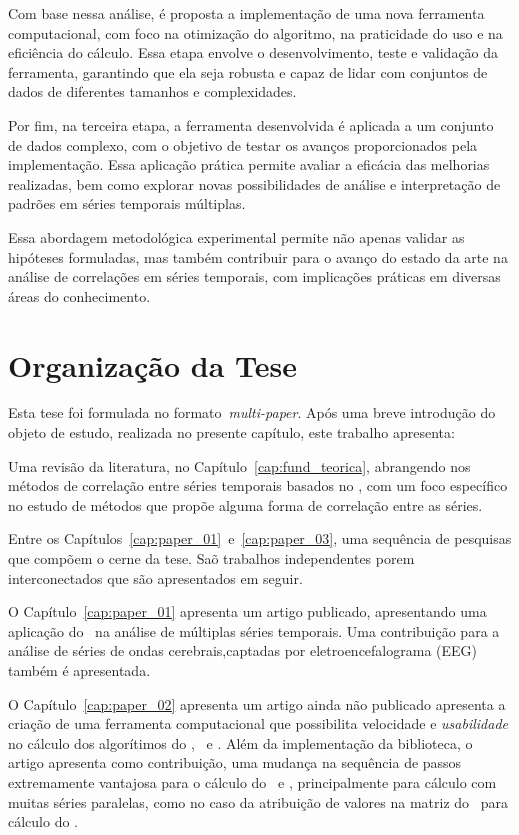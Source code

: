 Com base nessa análise, é proposta a implementação de uma nova ferramenta computacional, com foco na otimização do algoritmo, na praticidade do uso e na eficiência do cálculo. Essa etapa envolve o desenvolvimento, teste e validação da ferramenta, garantindo que ela seja robusta e capaz de lidar com conjuntos de dados de diferentes tamanhos e complexidades.

Por fim, na terceira etapa, a ferramenta desenvolvida é aplicada a um conjunto de dados complexo, com o objetivo de testar os avanços proporcionados pela implementação. Essa aplicação prática permite avaliar a eficácia das melhorias realizadas, bem como explorar novas possibilidades de análise e interpretação de padrões em séries temporais múltiplas.

Essa abordagem metodológica experimental permite não apenas validar as hipóteses formuladas, mas também contribuir para o avanço do estado da arte na análise de correlações em séries temporais, com implicações práticas em diversas áreas do conhecimento.

\section{Organização da Tese}
\label{sec:organizacao}

Esta tese foi formulada no formato~\emph{multi-paper}. Após uma breve introdução do objeto de estudo, realizada no presente capítulo, este trabalho apresenta:

Uma revisão da literatura, no Capítulo~\ref{cap:fund_teorica}, abrangendo nos métodos de correlação entre séries temporais basados no \dfa, com um foco específico no estudo de métodos que propõe alguma forma de correlação entre as séries.

Entre os Capítulos~\ref{cap:paper_01}~e~\ref{cap:paper_03}, uma sequência de pesquisas que compõem o cerne da tese. Saõ trabalhos independentes porem interconectados que são apresentados em seguir. 

O Capítulo~\ref{cap:paper_01} apresenta um artigo publicado, apresentando uma aplicação do \dmc~na análise de múltiplas séries temporais. Uma contribuição para a análise de séries de ondas cerebrais,captadas por eletroencefalograma (EEG) também é apresentada.

O Capítulo~\ref{cap:paper_02} apresenta um artigo ainda não publicado apresenta a criação de uma ferramenta computacional que possibilita velocidade e \emph{usabilidade} no cálculo dos algorítimos do \dfa, \dcca~e \pdcca. Além da implementação da biblioteca, o artigo apresenta como contribuição, uma mudança na sequência de passos extremamente vantajosa para o cálculo do \dcca~e \pdcca, principalmente para cálculo com muitas séries paralelas, como no caso da atribuição de valores na matriz do \pdcca~para cálculo do \dmc.

